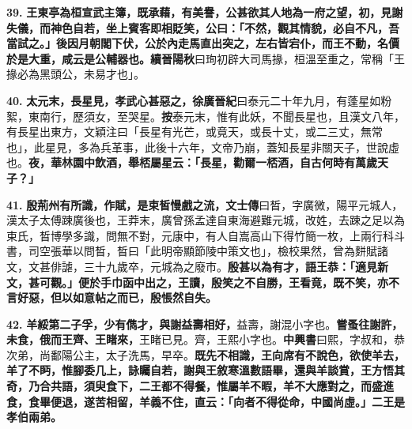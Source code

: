 \textbf{39.} \textbf{王東亭為桓宣武主簿，既承藉，有美譽，公甚欲其人地為一府之望，初，見謝失儀，而神色自若，坐上賓客即相貶笑，公曰：「不然，觀其情貌，必自不凡，吾當試之。」後因月朝閣下伏，公於內走馬直出突之，左右皆宕仆，而王不動，名價於是大重，咸云是公輔器也。}{\footnotesize \textbf{續晉陽秋}曰珣初辟大司馬掾，桓溫至重之，常稱「王掾必為黑頭公，未易才也」。}

\textbf{40.} \textbf{太元末，長星見，孝武心甚惡之，}{\footnotesize \textbf{徐廣晉紀}曰泰元二十年九月，有蓬星如粉絮，東南行，歷須女，至哭星。\textbf{按}泰元末，惟有此妖，不聞長星也，且漢文八年，有長星出東方，文穎注曰「長星有光芒，或竟天，或長十丈，或二三丈，無常也」，此星見，多為兵革事，此後十六年，文帝乃崩，蓋知長星非關天子，世說虛也。}\textbf{夜，華林園中飲酒，舉桮屬星云：「長星，勸爾一桮酒，自古何時有萬歲天子？」}

\textbf{41.} \textbf{殷荊州有所識，作賦，是束皙慢戲之流，}{\footnotesize \textbf{文士傳}曰晳，字廣微，陽平元城人，漢太子太傅踈廣後也，王莽末，廣曾孫孟達自東海避難元城，改姓，去踈之足以為束氏，晳博學多識，問無不對，元康中，有人自嵩高山下得竹簡一枚，上兩行科斗書，司空張華以問晳，晳曰「此明帝顯節陵中策文也」，檢校果然，曾為䴵賦諸文，文甚俳謔，三十九歲卒，元城為之廢市。}\textbf{殷甚以為有才，語王恭：「適見新文，甚可觀。」便於手巾函中出之，王讀，殷笑之不自勝，王看竟，既不笑，亦不言好惡，但以如意帖之而已，殷悵然自失。}

\textbf{42.} \textbf{羊綏第二子孚，少有儁才，與謝益壽相好，}{\footnotesize 益壽，謝混小字也。}\textbf{嘗蚤往謝許，未食，俄而王齊、王睹來，}{\footnotesize 王睹已見。齊，王熙小字也。\textbf{中興書}曰熙，字叔和，恭次弟，尚鄱陽公主，太子洗馬，早卒。}\textbf{既先不相識，王向席有不說色，欲使羊去，羊了不眄，惟腳委几上，詠矚自若，謝與王敘寒溫數語畢，還與羊談賞，王方悟其奇，乃合共語，須臾食下，二王都不得餐，惟屬羊不暇，羊不大應對之，而盛進食，食畢便退，遂苦相留，羊義不住，直云：「向者不得從命，中國尚虛。」二王是孝伯兩弟。}